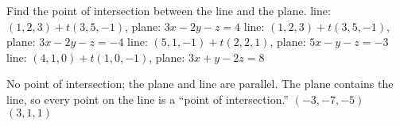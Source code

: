 
\begin{Exercise}[
name={},
title={}, 
difficulty=0,
origin={\cite{GHC}}]
Find the point of intersection between the line and the plane.
\Question line: $(1,2,3) + t(3,5,-1)$,\quad
plane: $3x-2y-z=4$
\Question line: $(1,2,3) + t(3,5,-1)$,\quad
plane: $3x-2y-z=-4$
\Question line: $(5,1,-1) + t(2,2,1)$,\quad
plane: $5x-y-z=-3$
\Question line: $(4,1,0) + t(1,0,-1)$,\quad
plane: $3x+y-2z=8$

\end{Exercise}
\begin{Answer}
\Question No point of intersection; the plane and line are parallel.
\Question The plane contains the line, so every point on the line is a ``point of intersection.''
\Question $(-3,-7,-5)$
\Question $(3,1,1)$

\end{Answer}

